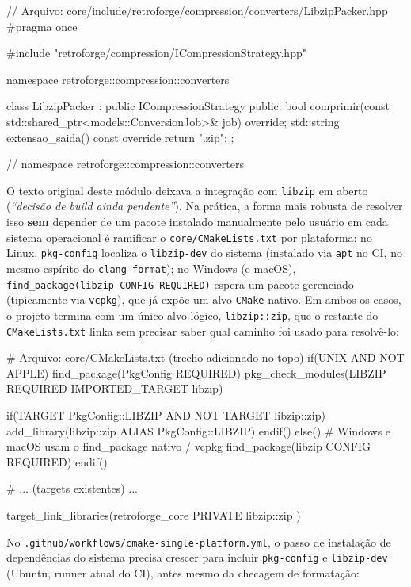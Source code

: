 \begin{CaixaCodigo}
// Arquivo: core/include/retroforge/compression/converters/LibzipPacker.hpp
#pragma once

#include "retroforge/compression/ICompressionStrategy.hpp"

namespace retroforge::compression::converters {

class LibzipPacker : public ICompressionStrategy {
public:
    bool comprimir(const std::shared_ptr<models::ConversionJob>& job) override;
    std::string extensao_saida() const override { return ".zip"; }
};

} // namespace retroforge::compression::converters
\end{CaixaCodigo}

\begin{CaixaInfo}[title={Compilando \texttt{libzip} em Windows e Linux}]
O texto original deste módulo deixava a integração com \texttt{libzip} em aberto (\textit{``decisão de build ainda pendente''}). Na prática, a forma mais robusta de resolver isso \textbf{sem} depender de um pacote instalado manualmente pelo usuário em cada sistema operacional é ramificar o \texttt{core/CMakeLists.txt} por plataforma: no Linux, \texttt{pkg-config} localiza o \texttt{libzip-dev} do sistema (instalado via \texttt{apt} no CI, no mesmo espírito do \texttt{clang-format}); no Windows (e macOS), \texttt{find\_package(libzip CONFIG REQUIRED)} espera um pacote gerenciado (tipicamente via \texttt{vcpkg}), que já expõe um alvo \texttt{CMake} nativo. Em ambos os casos, o projeto termina com um único alvo lógico, \texttt{libzip::zip}, que o restante do \texttt{CMakeLists.txt} linka sem precisar saber qual caminho foi usado para resolvê-lo:

\begin{CaixaCodigo}
# Arquivo: core/CMakeLists.txt (trecho adicionado no topo)
if(UNIX AND NOT APPLE)
    find_package(PkgConfig REQUIRED)
    pkg_check_modules(LIBZIP REQUIRED IMPORTED_TARGET libzip)

    if(TARGET PkgConfig::LIBZIP AND NOT TARGET libzip::zip)
        add_library(libzip::zip ALIAS PkgConfig::LIBZIP)
    endif()
else()
    # Windows e macOS usam o find_package nativo / vcpkg
    find_package(libzip CONFIG REQUIRED)
endif()

# ... (targets existentes) ...

target_link_libraries(retroforge_core PRIVATE
    libzip::zip
)
\end{CaixaCodigo}

No \texttt{.github/workflows/cmake-single-platform.yml}, o passo de instalação de dependências do sistema precisa crescer para incluir \texttt{pkg-config} e \texttt{libzip-dev} (Ubuntu, runner atual do CI), antes mesmo da checagem de formatação:


\end{CaixaInfo}
